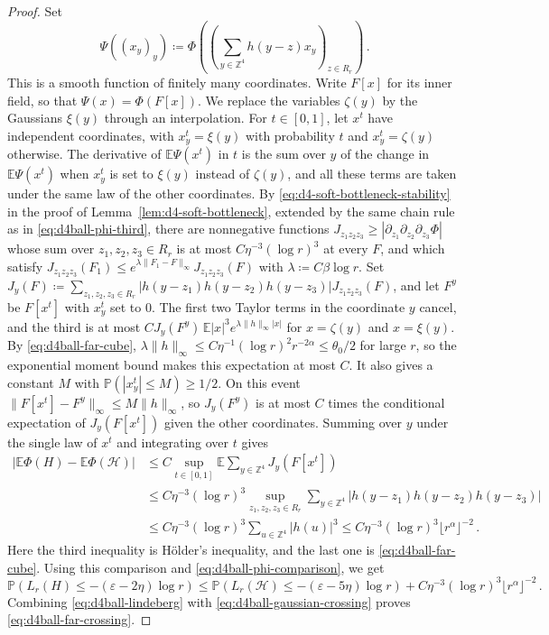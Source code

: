 \documentclass[11pt]{amsart}
\theoremstyle{plain}
\theoremstyle{definition}
\newcommand{\Z}{\mathbb{Z}}
\newcommand{\E}{\mathbb{E}}
\renewcommand{\P}{\mathbb{P}}
\begin{document}
\begin{proof}
Set
\[
	\Psi((x_y)_y)\coloneqq
	\Phi\left(\left(\sum_{y\in\Z^4} h(y-z)x_y\right)_{z\in R_r}\right)\, .
\]
This is a smooth function of finitely many coordinates. Write $F[x]$ for its
inner field, so that $\Psi(x)=\Phi(F[x])$. We replace the variables $\zeta(y)$
by the Gaussians $\xi(y)$ through an interpolation. For $t\in[0,1]$, let $x^t$
have independent coordinates, with $x^t_y=\xi(y)$ with probability $t$ and
$x^t_y=\zeta(y)$ otherwise. The derivative of $\E\Psi(x^t)$ in $t$ is the sum
over $y$ of the change in $\E\Psi(x^t)$ when $x^t_y$ is set to $\xi(y)$ instead
of $\zeta(y)$, and all these terms are taken under the same law of the other
coordinates. By \eqref{eq:d4-soft-bottleneck-stability} in the proof of
Lemma~\ref{lem:d4-soft-bottleneck}, extended by the same chain rule as in
\eqref{eq:d4ball-phi-third}, there are
nonnegative functions
$J_{z_1z_2z_3}\geq|\partial_{z_1}\partial_{z_2}\partial_{z_3}\Phi|$ whose sum
over $z_1,z_2,z_3\in R_r$ is at most $C\eta^{-3}(\log r)^3$ at every $F$, and
which satisfy $J_{z_1z_2z_3}(F_1)\leq e^{\lambda\|F_1-F\|_\infty}J_{z_1z_2z_3}(F)$
with $\lambda\coloneqq C\beta\log r$. Set
$J_y(F)\coloneqq\sum_{z_1,z_2,z_3\in R_r}|h(y-z_1)h(y-z_2)h(y-z_3)|J_{z_1z_2z_3}(F)$,
and let $F^y$ be $F[x^t]$ with $x^t_y$ set to $0$. The first two Taylor terms in
the coordinate $y$ cancel, and the third is at most
$CJ_y(F^y)\,\E|x|^3e^{\lambda\|h\|_\infty|x|}$ for $x=\zeta(y)$ and
$x=\xi(y)$. By \eqref{eq:d4ball-far-cube},
$\lambda\|h\|_\infty\leq C\eta^{-1}(\log r)^2r^{-2\alpha}\leq\theta_0/2$ for
large $r$, so the exponential moment bound makes this expectation at most $C$.
It also gives a constant $M$ with $\P(|x^t_y|\leq M)\geq1/2$. On this event
$\|F[x^t]-F^y\|_\infty\leq M\|h\|_\infty$, so $J_y(F^y)$ is at most $C$ times
the conditional expectation of $J_y(F[x^t])$ given the other coordinates.
Summing over $y$ under the single law of $x^t$ and integrating over $t$ gives
\[
\begin{aligned}
	\left|\E\Phi(H)-\E\Phi(\mathcal H)\right|
	&\leq
	C\sup_{t\in[0,1]}\E\sum_{y\in\Z^4}J_y(F[x^t])\\
	&\leq
	C\eta^{-3}(\log r)^3
	\sup_{z_1,z_2,z_3\in R_r}
	\sum_{y\in\Z^4}
	|h(y-z_1)h(y-z_2)h(y-z_3)|  \\
	&\leq
	C\eta^{-3}(\log r)^3\sum_{u\in\Z^4}|h(u)|^3
	\leq
	C\eta^{-3}(\log r)^3\lfloor r^\alpha\rfloor^{-2}\, .
\end{aligned}
\]
Here the third inequality is H\"older's inequality, and the last one is
\eqref{eq:d4ball-far-cube}. Using this comparison and
\eqref{eq:d4ball-phi-comparison}, we get
\begin{equation}\label{eq:d4ball-lindeberg}
    \P\left(L_r(H)\leq-(\varepsilon-2\eta)\log r\right)
    \leq
    \P\left(L_r(\mathcal H)\leq-(\varepsilon-5\eta)\log r\right)
    +
    C\eta^{-3}(\log r)^3\lfloor r^\alpha\rfloor^{-2}\, .
\end{equation}
Combining \eqref{eq:d4ball-lindeberg} with
\eqref{eq:d4ball-gaussian-crossing} proves
\eqref{eq:d4ball-far-crossing}.


\end{proof}
\end{document}
